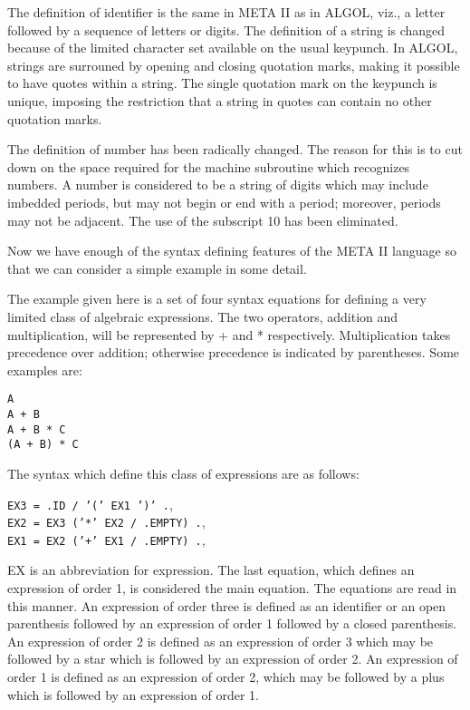 \documentclass[twocolumn]{article}
\begin{document}
The definition of identifier is the same in META II as in ALGOL, viz., a letter
followed by a sequence of letters or digits.
The definition of a string is changed because of the limited character set
available on the usual keypunch.
In ALGOL, strings are surrouned by opening and closing quotation marks,
making it possible to have quotes within a string. The single quotation mark
on the keypunch is unique, imposing the restriction that a string in quotes 
can contain no other quotation marks.

The definition of number has been radically changed.
The reason for this is to cut down on the space required for the machine
subroutine which recognizes numbers.
A number is considered to be a string of digits which may include imbedded
periods, but may not begin or end with a period; moreover, periods may not
be adjacent. The use of the subscript 10 has been eliminated.

Now we have enough of the syntax defining features of the META II language
so that we can consider a simple example in some detail.

The example given here is a set of four syntax equations for defining a very
limited class of algebraic expressions.
The two operators, addition and multiplication, will be represented by +
and * respectively.
Multiplication takes precedence over addition; otherwise precedence is
indicated by parentheses.
Some examples are:

\begin{center}
{\tt A } \\
{\tt A + B } \\
{\tt A + B * C } \\
{\tt (A + B) * C }
\end{center}

The syntax which define this class of expressions are as follows:

\begin{center}
{\tt EX3 = .ID / '(' EX1 ')' .}, \\
{\tt EX2 = EX3 ('*' EX2 / .EMPTY) .}, \\
{\tt EX1 = EX2 ('+' EX1 / .EMPTY) .},
\end{center}

EX is an abbreviation for expression.
The last equation, which defines an expression of order 1, is considered
the main equation.
The equations are read in this manner.
An expression of order three is defined as an identifier or an open
parenthesis followed by an expression of order 1 followed by a closed
parenthesis.
An expression of order 2 is defined as an expression of order 3 which
may be followed by a star which is followed by an expression of order 2.
An expression of order 1 is defined as an expression of order 2,
which may be followed by a plus which is followed by an expression of order 1.
\end{document}
